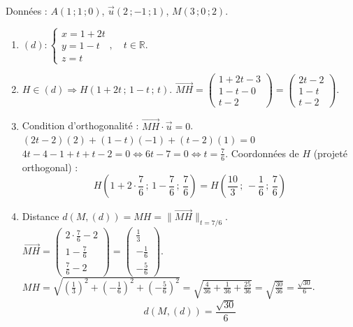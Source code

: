\documentclass[11pt]{article}
\begin{document}
\begin{corrige}
Données : $A(1\,;1\,;0)$, $\vec{u}(2\,;-1\,;1)$, $M(3\,;0\,;2)$.
\begin{enumerate}
\item $(d) : \begin{cases} x = 1 + 2t \\ y = 1 - t \\ z = t \end{cases},\quad t\in\mathbb{R}$.

\item $H \in (d) \Rightarrow H(1+2t\,;\,1-t\,;\,t)$.
$\overrightarrow{MH} = \begin{pmatrix}1+2t-3 \\ 1-t-0 \\ t-2\end{pmatrix} = \begin{pmatrix}2t-2 \\ 1-t \\ t-2\end{pmatrix}$.

\item Condition d'orthogonalité : $\overrightarrow{MH} \cdot \vec{u} = 0$.
$(2t-2)(2) + (1-t)(-1) + (t-2)(1) = 0$
$4t - 4 -1 + t + t - 2 = 0 \iff 6t - 7 = 0 \iff t = \frac{7}{6}$.
Coordonnées de $H$ (projeté orthogonal) :
\[
H\left(1+2\cdot\frac{7}{6}\,;\,1-\frac{7}{6}\,;\,\frac{7}{6}\right) = \boxed{H\left(\frac{10}{3}\,;\,-\frac{1}{6}\,;\,\frac{7}{6}\right)}
\]

\item Distance $d(M,(d)) = MH = \|\overrightarrow{MH}\|_{t=7/6}$.
$\overrightarrow{MH} = \begin{pmatrix}2\cdot\frac{7}{6}-2 \\ 1-\frac{7}{6} \\ \frac{7}{6}-2\end{pmatrix} = \begin{pmatrix}\frac{1}{3} \\ -\frac{1}{6} \\ -\frac{5}{6}\end{pmatrix}$.
$MH = \sqrt{\left(\frac{1}{3}\right)^2 + \left(-\frac{1}{6}\right)^2 + \left(-\frac{5}{6}\right)^2} = \sqrt{\frac{4}{36} + \frac{1}{36} + \frac{25}{36}} = \sqrt{\frac{30}{36}} = \frac{\sqrt{30}}{6}$.
\[
\boxed{d(M,(d)) = \frac{\sqrt{30}}{6}}
\]
\end{enumerate}
\end{corrige}
\end{document}
